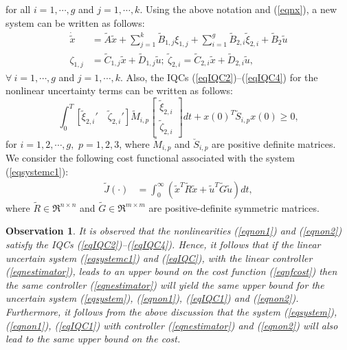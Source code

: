 \documentclass[twocolumn]{autart}
\newtheorem{observation}{Observation}                                                \DeclareMathOperator*{\infy}{inf}
\begin{document}
\noindent for all $i=1,\cdots,g$ and $j=1,\cdots,k$. Using the above notation and (\ref{eqnx}), a new system can be written as follows:
\begin{equation}
\label{eqsystemc1}
\begin{split}
\dot{\tilde{x}}&=\tilde{A}\tilde{x}+\sum_{j=1}^k \tilde{B}_{1,j} \xi_{1,j} +\sum_{i=1}^g \tilde{B}_{2,i} \tilde{\xi}_{2,i} + \tilde{B}_2\tilde{u}\\
\zeta_{1,j}&=\tilde{C}_{1,j}\tilde{x}+\tilde{D}_{1,j} \tilde{u};~\tilde{\zeta}_{2,i}=\tilde{C}_{2,i}\tilde{x}+\tilde{D}_{2,i} \tilde{u},
\end{split}
\end{equation}
$\forall~ i=1,\cdots,g$ and $j=1,\cdots,k$. Also, the IQCs (\ref{eqIQC2})--(\ref{eqIQC4}) for the nonlinear uncertainty terms can be written as follows:
\begin{equation}
\label{eqIQC}
\int_0^{T}  [\tilde{\xi}_{2,i}' \quad \tilde{\zeta}_{2,i}'] \tilde{M}_{i,p} \left[
\begin{array}{c}
\tilde{\xi}_{2,i}\\
\tilde{\zeta}_{2,i}
\end{array}\right] dt +x(0)^T \tilde{S}_{i,p} x(0)\geq 0,
\end{equation}
for $i=1,2, \cdots, g,$ $p=1,2,3$, where $\tilde{M}_{i,p}$ and $\breve{S}_{i,p}$ are positive definite matrices. We consider the following cost functional associated with the system (\ref{eqsystemc1}):
\begin{equation}
\label{eqnfcost}
\begin{split}
\tilde{J}(\cdot)&=\int_0^\infty(\tilde{x}^T \tilde{R} \tilde{x}+\tilde{u}^T \tilde{G} \tilde{u})dt,
\end{split}
\end{equation}
where $\tilde{R}\in \Re^{n \times n}$ and $\tilde{G}\in \Re^{m \times m}$ are positive-definite symmetric matrices. 
\begin{observation}\label{Obs1}
It is observed that the nonlinearities (\ref{eqnon1}) and (\ref{eqnon2}) satisfy the IQCs (\ref{eqIQC2})--(\ref{eqIQC4}). Hence, it follows that if the linear uncertain system (\ref{eqsystemc1}) and (\ref{eqIQC}), with the linear controller (\ref{eqnestimator}), leads to an upper bound on the cost function (\ref{eqnfcost}) then the same controller (\ref{eqnestimator}) will yield the same upper bound for the uncertain system (\ref{eqsystem}), (\ref{eqnon1}), (\ref{eqIQC1}) and (\ref{eqnon2}). Furthermore, it follows from the above discussion that the system (\ref{eqsystem}), (\ref{eqnon1}), (\ref{eqIQC1}) with controller (\ref{eqnestimator}) and (\ref{eqnon2}) will also lead to the same upper bound on the cost.
\end{observation}
\end{document}
